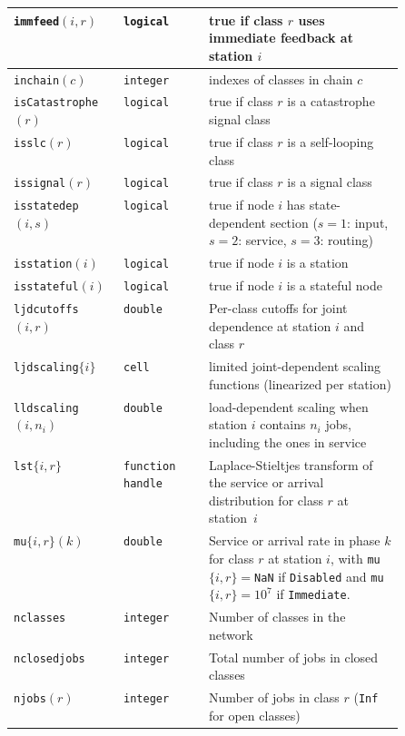 \begin{MATLAB}
\begin{table}[thbp]
{\begin{tabular}{|l|l|p{0.5\linewidth}|}
\texttt{immfeed}$(i,r)$ & \texttt{logical} & true if class $r$ uses immediate feedback at station $i$\\\hline
\texttt{inchain}$(c)$ & \texttt{integer} & indexes of classes in chain $c$\\\hline
\texttt{isCatastrophe}$(r)$ & \texttt{logical} & true if class $r$ is a catastrophe signal class\\\hline
{\texttt{isslc}}$(r)$ & {\texttt{logical}} & true if class $r$ is a self-looping class\\\hline
\texttt{issignal}$(r)$ & \texttt{logical} & true if class $r$ is a signal class\\\hline
{\texttt{isstatedep}}$(i,s)$ & {\texttt{logical}} & true if node $i$ has state-dependent section ($s=1$: input, $s=2$: service, $s=3$: routing)\\\hline
{\texttt{isstation}}$(i)$ & {\texttt{logical}} & true if node $i$ is a station\\\hline
{\texttt{isstateful}}$(i)$ & {\texttt{logical}} & true if node $i$ is a stateful node\\\hline
\texttt{ljdcutoffs}$(i,r)$ & \texttt{double} & Per-class cutoffs for joint dependence at station $i$ and class $r$\\\hline
{\texttt{ljdscaling}}$\{i\}$ & {\texttt{cell}} & limited joint-dependent scaling functions (linearized per station)\\\hline
{\texttt{lldscaling}}$(i,n_i)$ & {\texttt{double}} & load-dependent scaling when station $i$ contains $n_i$ jobs, including the ones in service \\\hline
\texttt{lst}$\{i,r\}$ & \texttt{function handle} & Laplace-Stieltjes transform of the service or arrival distribution for class $r$ at station~$i$\\\hline
\texttt{mu}$\{i,r\}(k)$ & \texttt{double} & Service or arrival rate in phase $k$ for class $r$ at station $i$, with \texttt{mu}$\{i,r\}=$\texttt{NaN} if \texttt{Disabled} and \texttt{mu}$\{i,r\}=10^7$ if \texttt{Immediate}.\\\hline
\texttt{nclasses} & \texttt{integer} & Number of classes in the network\\\hline
\texttt{nclosedjobs} & \texttt{integer} & Total number of jobs in closed classes\\\hline
\texttt{njobs}$(r)$ & \texttt{integer} & Number of jobs in class $r$ (\texttt{Inf} for open classes)\\\hline

\end{tabular}}
\end{table}
\end{MATLAB}
